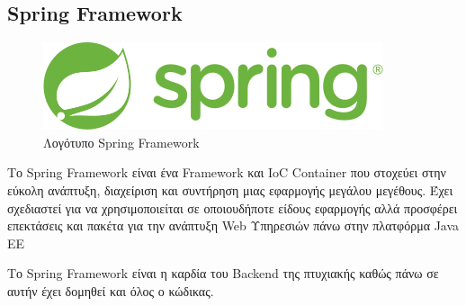 \subsection{Spring Framework}

\begin{figure}[h]
  \centering
  \includegraphics[]{Chapters/3 - Technologies/Images/spring-logo-9146a4d3298760c2e7e49595184e1975.png}
  \caption{Λογότυπο Spring Framework}
  \label{fig:spring-logo}
\end{figure}

Το Spring Framework είναι ένα Framework και IoC Container που στοχεύει στην εύκολη ανάπτυξη, διαχείριση και συντήρηση μιας εφαρμογής μεγάλου μεγέθους. Έχει σχεδιαστεί για να χρησιμοποιείται σε οποιουδήποτε είδους εφαρμογής αλλά προσφέρει επεκτάσεις και πακέτα για την ανάπτυξη Web Υπηρεσιών πάνω στην πλατφόρμα Java EE ~\citep{wiki:spring}

Το Spring Framework είναι η καρδία του Backend της πτυχιακής καθώς πάνω σε αυτήν έχει δομηθεί και όλος ο κώδικας.
